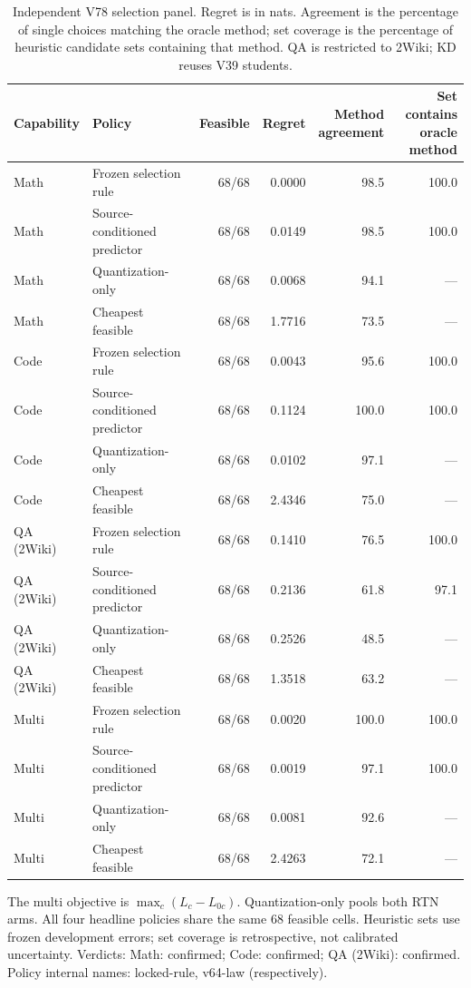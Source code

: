 \begin{table}[H]
\centering\small
\setlength{\tabcolsep}{3pt}
\caption{Independent V78 selection panel. Regret is in nats. Agreement is the percentage of single choices matching the oracle method; set coverage is the percentage of heuristic candidate sets containing that method. QA is restricted to 2Wiki; KD reuses V39 students.}
\label{tab:rule-confirm}
\begin{tabularx}{\linewidth}{lXrrrr}
\toprule
Capability & Policy & Feasible & Regret & \shortstack{Method\\agreement} & \shortstack{Set contains\\oracle method} \\
\midrule
Math & Frozen selection rule & 68/68 & 0.0000 & 98.5 & 100.0 \\
Math & Source-conditioned predictor & 68/68 & 0.0149 & 98.5 & 100.0 \\
Math & Quantization-only & 68/68 & 0.0068 & 94.1 & --- \\
Math & Cheapest feasible & 68/68 & 1.7716 & 73.5 & --- \\
\midrule
Code & Frozen selection rule & 68/68 & 0.0043 & 95.6 & 100.0 \\
Code & Source-conditioned predictor & 68/68 & 0.1124 & 100.0 & 100.0 \\
Code & Quantization-only & 68/68 & 0.0102 & 97.1 & --- \\
Code & Cheapest feasible & 68/68 & 2.4346 & 75.0 & --- \\
\midrule
QA (2Wiki) & Frozen selection rule & 68/68 & 0.1410 & 76.5 & 100.0 \\
QA (2Wiki) & Source-conditioned predictor & 68/68 & 0.2136 & 61.8 & 97.1 \\
QA (2Wiki) & Quantization-only & 68/68 & 0.2526 & 48.5 & --- \\
QA (2Wiki) & Cheapest feasible & 68/68 & 1.3518 & 63.2 & --- \\
\midrule
Multi & Frozen selection rule & 68/68 & 0.0020 & 100.0 & 100.0 \\
Multi & Source-conditioned predictor & 68/68 & 0.0019 & 97.1 & 100.0 \\
Multi & Quantization-only & 68/68 & 0.0081 & 92.6 & --- \\
Multi & Cheapest feasible & 68/68 & 2.4263 & 72.1 & --- \\
\bottomrule
\end{tabularx}
\par\smallskip\begin{minipage}{\linewidth}\footnotesize
The multi objective is $\max_c(L_c-L_{0c})$. Quantization-only pools both RTN arms. All four headline policies share the same 68 feasible cells. Heuristic sets use frozen development errors; set coverage is retrospective, not calibrated uncertainty. Verdicts: Math: confirmed; Code: confirmed; QA (2Wiki): confirmed. Policy internal names: locked-rule, v64-law (respectively).
\end{minipage}
\end{table}
